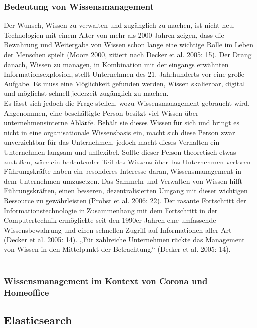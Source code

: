 \documentclass[a4paper]{scrartcl}
\begin{document}
\subsubsection{Bedeutung von Wissensmanagement}
Der Wunsch, Wissen zu verwalten und zugänglich zu machen, ist nicht neu. Technologien mit einem Alter von mehr als 2000 Jahren zeigen, dass die Bewahrung und Weitergabe von Wissen schon lange eine wichtige Rolle im Leben der Menschen spielt (Moore 2000, zitiert nach Decker et al. 2005: 15). Der Drang danach, Wissen zu managen, in Kombination mit der eingangs erwähnten Informationsexplosion, stellt Unternehmen des 21. Jahrhunderts vor eine große Aufgabe. Es muss eine Möglichkeit gefunden werden, Wissen skalierbar, digital und möglichst schnell jederzeit zugänglich zu machen. \\
Es lässt sich jedoch die Frage stellen, wozu Wissensmanagement gebraucht wird. Angenommen, eine beschäftigte Person besitzt viel Wissen über unternehmensinterne Abläufe. Behält sie dieses Wissen für sich und bringt es nicht in eine organisationale Wissensbasis ein, macht sich diese Person zwar unverzichtbar für das Unternehmen, jedoch macht dieses Verhalten ein Unternehmen langsam und unflexibel. Sollte dieser Person theoretisch etwas zustoßen, wäre ein bedeutender Teil des Wissens über das Unternehmen verloren. \\
Führungskräfte haben ein besonderes Interesse daran, Wissensmanagement in dem Unternehmen umzusetzen. Das Sammeln und Verwalten von Wissen hilft Führungskräften, einen besseren, dezentralisierten Umgang mit dieser wichtigen Ressource zu gewährleisten (Probst et al. 2006: 22). Der rasante Fortschritt der Informationstechnologie in Zusammenhang mit dem Fortschritt in der Computertechnik ermöglichte seit den 1990er Jahren eine umfassende Wissensbewahrung und einen schnellen Zugriff auf Informationen aller Art (Decker et al. 2005: 14). „Für zahlreiche Unternehmen rückte das Management von Wissen in den Mittelpunkt der Betrachtung.“ (Decker et al. 2005: 14). \\ \\

\subsubsection{Wissensmanagement im Kontext von Corona und Homeoffice}


\subsection{Elasticsearch}
\end{document}

